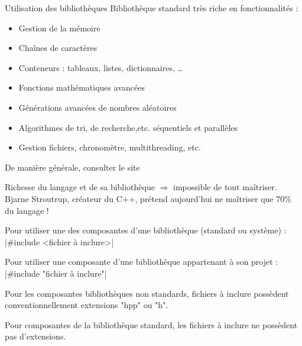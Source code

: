 \documentclass[compress,10pt,aspectratio=169]{beamer}
\begin{document}
\begin{frame}[fragile]{Utilisation des bibliothèques}
    \scriptsize
    Bibliothèque standard très riche en fonctionnalités :
    \begin{multicols}{3}
    \begin{itemize}
        \item Gestion de la mémoire
        \item Chaînes de caractères
        \item Conteneurs : tableaux, listes, dictionnaires, \ldots
        \item Fonctions mathématiques avancées
        \item Générations avancées de nombres aléatoires
        \item Algorithmes de tri, de recherche,etc. séquentiels et parallèles
        \item Gestion fichiers, chronomètre, multithreading, etc.
    \end{itemize}
\end{multicols}
\vspace*{-5mm}
    De manière générale, consulter le site \href{https://en.cppreference.com/w/}{}

    Richesse du langage et de sa bibliothèque $\Rightarrow$ impossible de tout maîtriser. Bjarne Stroutrup, créateur du C++, prétend aujourd'hui
    ne maîtriser que 70\% du langage !

    Pour utiliser une des composantes d'une bibliothèque (standard ou système) : |#include <fichier à inclure>|

    Pour utiliser une composante d'une bibliothèque appartenant à son projet : |#include "fichier à inclure"|

    Pour les composantes bibliothèques non standards, fichiers à inclure possèdent conventionnellement extensions "hpp" ou "h".

    Pour composantes de la bibliothèque standard, les fichiers à inclure ne possèdent pas d'extensions.
\end{frame}
\end{document}
